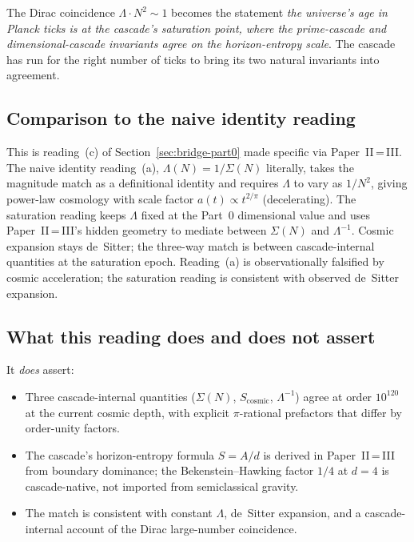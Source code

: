 \documentclass[11pt,a4paper]{article}
\begin{document}
The Dirac coincidence $\Lambda \cdot N^2 \sim 1$ becomes the
statement \emph{the universe's age in Planck ticks is at the cascade's
saturation point, where the prime-cascade and dimensional-cascade
invariants agree on the horizon-entropy scale}. The cascade has run
for the right number of ticks to bring its two natural invariants
into agreement.

\subsection*{Comparison to the naive identity reading}

This is reading~(c) of Section~\ref{sec:bridge-part0} made specific
via Paper~II\,=\,III. The naive identity reading~(a),
$\Lambda(N) = 1/\Sigma(N)$ literally, takes the magnitude match as
a definitional identity and requires $\Lambda$ to vary as $1/N^2$,
giving power-law cosmology with scale factor $a(t) \propto t^{2/\pi}$
(decelerating). The saturation reading keeps $\Lambda$ fixed at the
Part~0 dimensional value and uses Paper~II\,=\,III's hidden geometry
to mediate between $\Sigma(N)$ and $\Lambda^{-1}$. Cosmic expansion
stays de~Sitter; the three-way match is between cascade-internal
quantities at the saturation epoch. Reading~(a) is observationally
falsified by cosmic acceleration; the saturation reading is
consistent with observed de~Sitter expansion.

\subsection*{What this reading does and does not assert}

It \emph{does} assert:
\begin{itemize}
\item Three cascade-internal quantities ($\Sigma(N)$,
$S_{\mathrm{cosmic}}$, $\Lambda^{-1}$) agree at order $10^{120}$ at
the current cosmic depth, with explicit $\pi$-rational prefactors
that differ by order-unity factors.
\item The cascade's horizon-entropy formula $S = A/d$ is derived in
Paper~II\,=\,III from boundary dominance; the Bekenstein--Hawking
factor $1/4$ at $d = 4$ is cascade-native, not imported from
semiclassical gravity.
\item The match is consistent with constant $\Lambda$, de~Sitter
expansion, and a cascade-internal account of the Dirac large-number
coincidence.
\end{itemize}
\end{document}
